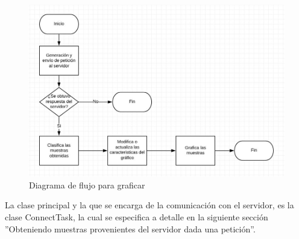 \begin{figure}[H]
	\centering
	\includegraphics[scale=.6]{Capitulo5/images/DiagramaDeFlujoGraficar.JPG}
	\caption{Diagrama de flujo para graficar}	\label{fig:Diagrama de flujo para graficar}
\end{figure} 

La clase principal y la que se encarga de la comunicación con el servidor, es la clase ConnectTask, la cual se especifica a detalle en la siguiente sección ''Obteniendo muestras provenientes del servidor dada una petición''. \\ \newline

